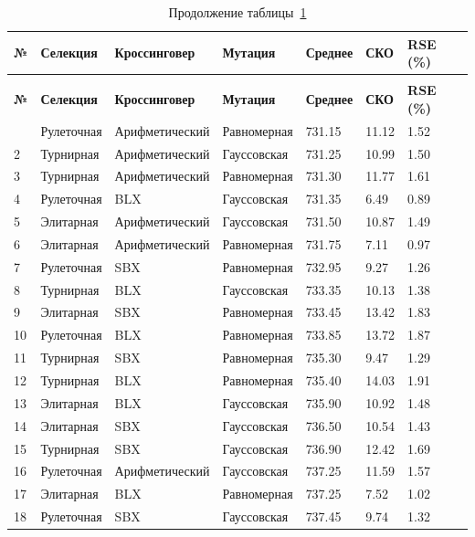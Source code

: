 \begin{longtable}{|p{}|p{}|p{}|p{}|p{}|p{}|p{}|}
	\caption{Результаты для задачи st70.tsp. Оптимальное решение 675.00}\label{tbl:st70.tsp} \\
	\hline
	\textbf{№} & \textbf{Селекция} & \textbf{Кроссинговер} & \textbf{Мутация} & \textbf{Среднее} & \textbf{СКО} & \textbf{RSE (\%)} \\
	\hline
	\endfirsthead
	\caption*{Продолжение таблицы~\ref{tbl:st70.tsp}} \\
	\hline
	\textbf{№} & \textbf{Селекция} & \textbf{Кроссинговер} & \textbf{Мутация} & \textbf{Среднее} & \textbf{СКО} & \textbf{RSE (\%)} \\
	\hline
	\endhead
	\hline
	\endfoot
	\endlastfoot
	1 & Рулеточная & Арифметический & Равномерная & 731.15 & 11.12 & 1.52 \\
	\hline
	2 & Турнирная & Арифметический & Гауссовская & 731.25 & 10.99 & 1.50 \\
	\hline
	3 & Турнирная & Арифметический & Равномерная & 731.30 & 11.77 & 1.61 \\
	\hline
	4 & Рулеточная & BLX & Гауссовская & 731.35 & 6.49 & 0.89 \\
	\hline
	5 & Элитарная & Арифметический & Гауссовская & 731.50 & 10.87 & 1.49 \\
	\hline
	6 & Элитарная & Арифметический & Равномерная & 731.75 & 7.11 & 0.97 \\
	\hline
	7 & Рулеточная & SBX & Равномерная & 732.95 & 9.27 & 1.26 \\
	\hline
	8 & Турнирная & BLX & Гауссовская & 733.35 & 10.13 & 1.38 \\
	\hline
	9 & Элитарная & SBX & Равномерная & 733.45 & 13.42 & 1.83 \\
	\hline
	10 & Рулеточная & BLX & Равномерная & 733.85 & 13.72 & 1.87 \\
	\hline
	11 & Турнирная & SBX & Равномерная & 735.30 & 9.47 & 1.29 \\
	\hline
	12 & Турнирная & BLX & Равномерная & 735.40 & 14.03 & 1.91 \\
	\hline
	13 & Элитарная & BLX & Гауссовская & 735.90 & 10.92 & 1.48 \\
	\hline
	14 & Элитарная & SBX & Гауссовская & 736.50 & 10.54 & 1.43 \\
	\hline
	15 & Турнирная & SBX & Гауссовская & 736.90 & 12.42 & 1.69 \\
	\hline
	16 & Рулеточная & Арифметический & Гауссовская & 737.25 & 11.59 & 1.57 \\
	\hline
	17 & Элитарная & BLX & Равномерная & 737.25 & 7.52 & 1.02 \\
	\hline
	18 & Рулеточная & SBX & Гауссовская & 737.45 & 9.74 & 1.32 \\
	\hline
\end{longtable}


